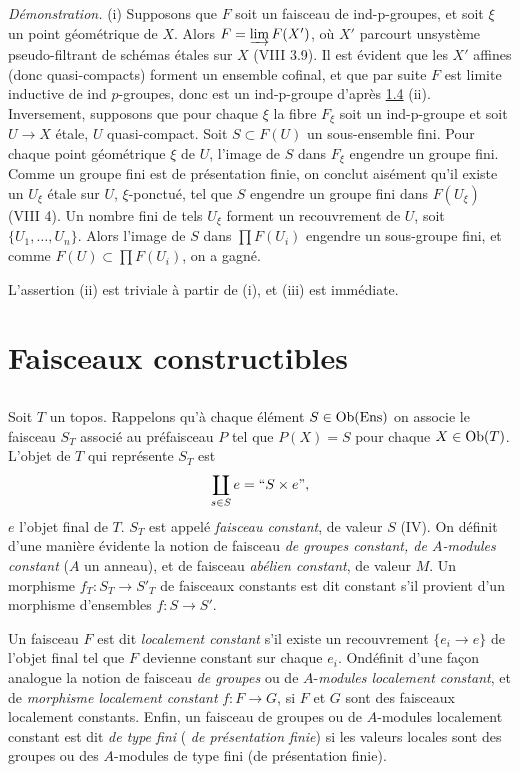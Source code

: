 \documentclass[10pt]{../fichiers-configuration-latex/smfart}
\begin{document}
\noindent
\emph{Démonstration.}
(i) Supposons que $F$ soit un faisceau de ind-p-groupes, et soit
  $\xi$ un point géométrique de $X$. Alors $F=\varinjlim F(X')$, où
  $X'$ parcourt un\pageoriginale système pseudo-filtrant de schémas
étales sur $X$ (VIII 3.9). Il est évident que les $X'$ affines (donc
quasi-compacts) forment un ensemble cofinal, et que par suite $F$ est
limite inductive de ind $p$-groupes, donc est un ind-p-groupe d'après
\hyperref[IX.prop1.4]{1.4} (ii). Inversement, supposons que pour chaque $\xi$ la fibre
$F_{\xi}$ soit un ind-p-groupe et soit $U\rightarrow X$ étale, $U$
quasi-compact. Soit $S\subset F(U)$ un sous-ensemble fini. Pour chaque
point géométrique $\xi$ de $U$, l'image de $S$ dans $F_{\xi}$ engendre
un groupe fini. Comme un groupe fini est de présentation finie, on
conclut aisément qu'il existe un $U_{\xi}$ étale sur $U$,
$\xi$-ponctué, tel que $S$ engendre un groupe fini dans $F(U_{\xi})$
(\cf VIII 4). Un nombre fini de tels $U_{\xi}$ forment un recouvrement
de $U$, soit $\{U_1,\ldots,U_n\}$. Alors l'image de $S$ dans $\prod
F(U_i)$ engendre un sous-groupe fini, et comme $F(U)\subset \prod
F(U_i)$, on a gagné.

L'assertion (ii) est triviale à partir de (i), et (iii) est immédiate.

\section{Faisceaux constructibles}

\setcounter{subsection}{-1}
\subsection{}
Soit $T$ un topos. Rappelons qu'à chaque élément $S\in \operatorname{Ob} (\operatorname{Ens})$ on
associe le faisceau $S_T$ associé au préfaisceau $P$ tel que $P(X)=S$
pour chaque $X\in \operatorname{Ob} (T)$. L'objet de $T$ qui représente $S_T$ est
$$
\coprod_{s\in S}e= ``S\times e \mbox{''}{},
$$
$e$ l'objet final de $T$. $S_T$ est appelé \emph{faisceau constant},
de valeur $S$ (IV). On définit d'une manière évidente la notion de
faisceau \emph{de groupes constant, de $A$-modules constant} ($A$ un
anneau), et de faisceau \emph{abélien constant}, de valeur $M$. Un
morphisme $f_T:S_T\rightarrow S'_T$ de faisceaux constants est dit
constant s'il provient d'un morphisme d'ensembles $f:S\rightarrow S'$.

Un faisceau $F$ est dit \emph{localement constant} s'il existe un
recouvrement $\{e_i\rightarrow e\}$ de l'objet final tel que $F$
devienne constant sur chaque $e_i$. On\pageoriginale définit d'une
façon analogue la notion de faisceau \emph{de groupes} ou de
$A$-\emph{modules localement constant}, et de \emph{morphisme
  localement constant} $f:F\rightarrow G$, si $F$ et $G$ sont des
faisceaux localement constants. Enfin, un faisceau de groupes ou de
$A$-modules localement constant est dit \emph{de type fini} (\resp
\emph{de présentation finie}) si les valeurs locales sont des groupes
ou des $A$-modules de type fini (\resp de présentation finie).
\end{document}
